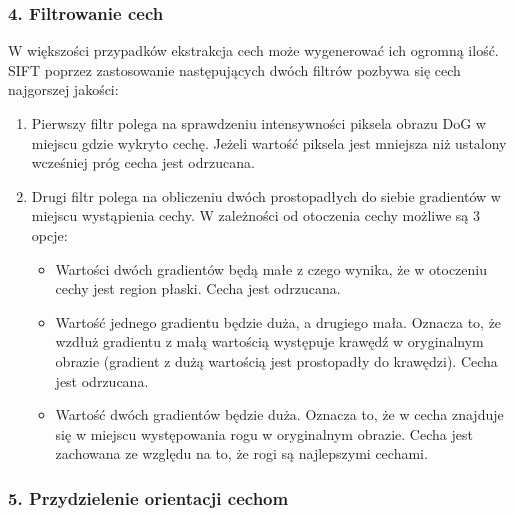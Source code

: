 \subsubsection{4. Filtrowanie cech}
\label{sec:proponowane_algorytmy:filtracja_cech}

W większości przypadków ekstrakcja cech może wygenerować ich ogromną ilość. SIFT poprzez zastosowanie następujących dwóch filtrów pozbywa się cech najgorszej jakości:

\begin{enumerate}
\item Pierwszy filtr polega na sprawdzeniu intensywności piksela obrazu DoG w miejscu gdzie wykryto cechę. Jeżeli wartość piksela jest mniejsza niż ustalony wcześniej próg cecha jest odrzucana.
\item Drugi filtr polega na obliczeniu dwóch prostopadłych do siebie gradientów w miejscu wystąpienia cechy. W zależności od otoczenia cechy możliwe są 3 opcje:
  \begin{itemize}
  \item Wartości dwóch gradientów będą małe z czego wynika, że w otoczeniu cechy jest region płaski. Cecha jest odrzucana.
  \item Wartość jednego gradientu będzie duża, a drugiego mała. Oznacza to, że wzdłuż gradientu z małą wartością występuje krawędź w oryginalnym obrazie (gradient z dużą wartością jest prostopadły do krawędzi). Cecha jest odrzucana.
  \item Wartość dwóch gradientów będzie duża. Oznacza to, że w cecha znajduje się w miejscu występowania rogu w oryginalnym obrazie. Cecha jest zachowana ze względu na to, że rogi są najlepszymi cechami.
  \end{itemize}
\end{enumerate}

\subsubsection{5. Przydzielenie orientacji cechom}
\label{sec:proponowane_algorytmy:orientacja}

